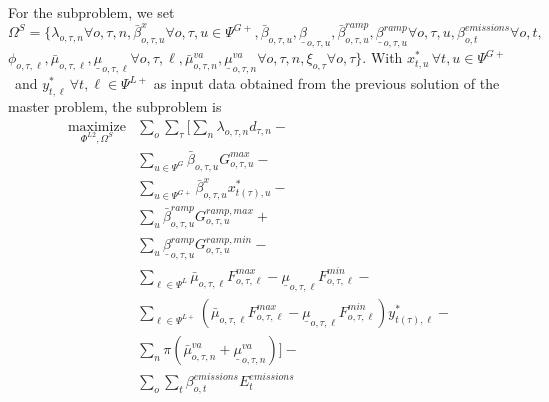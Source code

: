\documentclass[final]{IEEEtran}
\begin{document}
For the subproblem, we set $\Omega^{S} = \{ \lambda_{o, \tau, n} \forall o, \tau, n, \bar{\beta}^x_{o, \tau, u} \forall o, \tau, u \in \Psi^{G+}, \bar{\beta}_{o, \tau, u},  \underline{\beta}_{o, \tau, u}, \bar{\beta}_{o, \tau, u}^{ramp}, \underline{\beta}_{o, \tau, u}^{ramp} \forall o, \tau, u, \beta_{o, t}^{emissions} \forall o, t,$ $\phi_{o, \tau, \ell}, \bar{\mu}_{o, \tau, \ell}, \underline{\mu}_{o, \tau, \ell} \forall o, \tau, \ell, \bar{\mu}^{va}_{o, \tau, n}, \underline{\mu}^{va}_{o, \tau, n} \forall o, \tau, n, \xi_{o, \tau}  \forall o, \tau \}$. With $x_{t, u}^* \, \forall t, u \in \Psi^{G+}$ and $y_{t, \ell}^* \, \forall t, \ell \in \Psi^{L+}$ as input data obtained from the previous solution of the master problem, the subproblem is
\begin{align}
\label{sub_obj} \underset{\Phi^{L2}, \Omega^{S}}{\text{maximize}} &\sum\limits_o \sum\limits_{\tau} \Bigg[ \sum\limits_n \lambda_{o, \tau, n} d_{\tau, n} - \nonumber \\
&\sum\limits_{u \in \Psi^G} \bar{\beta}_{o, \tau, u} G_{o, \tau, u}^{max} - \nonumber \\
&\sum\limits_{u \in \Psi^{G+}} \bar{\beta}^x_{o, \tau, u} x_{t(\tau), u}^* - \nonumber \\
&\sum\limits_{u} \bar{\beta}_{o, \tau, u}^{ramp} G^{ramp,max}_{o, \tau, u} + \nonumber \\
&\sum\limits_{u} \underline{\beta}_{o, \tau, u}^{ramp} G^{ramp,min}_{o, \tau, u} - \nonumber \\
&\sum\limits_{\ell \in \Psi^L} \bar{\mu}_{o, \tau, \ell} F_{o, \tau, \ell}^{max} - \underline{\mu}_{o, \tau, \ell} F_{o, \tau, \ell}^{min} - \nonumber \\
&\sum\limits_{\ell \in \Psi^{L+}} \left( \bar{\mu}_{o, \tau, \ell} F_{o, \tau, \ell}^{max} - \underline{\mu}_{o, \tau, \ell} F_{o, \tau, \ell}^{min} \right) y_{t(\tau), \ell}^* - \nonumber \\
&\sum\limits_{n} \pi ( \bar{\mu}^{va}_{o, \tau, n} + \underline{\mu}^{va}_{o, \tau, n} ) \Bigg] - \nonumber \\
&\sum\limits_{o} \sum\limits_{t} \beta_{o, t}^{emissions} E^{emissions}_{t}
\end{align}
\end{document}
